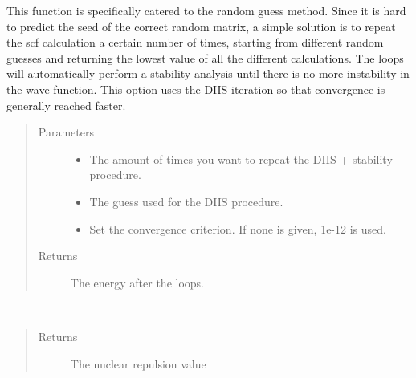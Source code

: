 \documentclass[letterpaper,10pt,english]{sphinxmanual}
\begin{document}
\begin{fulllineitems}
\begin{fulllineitems}
\label{\detokenize{Complex_GHF:ghf.complex_GHF.ComplexGHF.loop_calculations_diis}}
This function is specifically catered to the random guess method. Since it is hard to predict the seed of the
correct random matrix, a simple solution is to repeat the scf calculation a certain number of times, starting
from different random guesses and returning the lowest value of all the different calculations. The loops will
automatically perform a stability analysis until there is no more instability in the wave function. This option
uses the DIIS iteration so that convergence is generally reached faster.
\begin{quote}\begin{description}
\item[{Parameters}] \leavevmode\begin{itemize}
\item {} 
 \textendash{} The amount of times you want to repeat the DIIS + stability procedure.

\item {} 
 \textendash{} The guess used for the DIIS procedure.

\item {} 
 \textendash{} Set the convergence criterion. If none is given, 1e-12 is used.

\end{itemize}

\item[{Returns}] \leavevmode
The energy after the loops.

\end{description}\end{quote}

\end{fulllineitems}


\begin{fulllineitems}
\label{\detokenize{Complex_GHF:ghf.complex_GHF.ComplexGHF.nuc_rep}}~\begin{quote}\begin{description}
\item[{Returns}] \leavevmode
The nuclear repulsion value


\end{description}
\end{quote}
\end{fulllineitems}
\end{fulllineitems}
\end{document}
